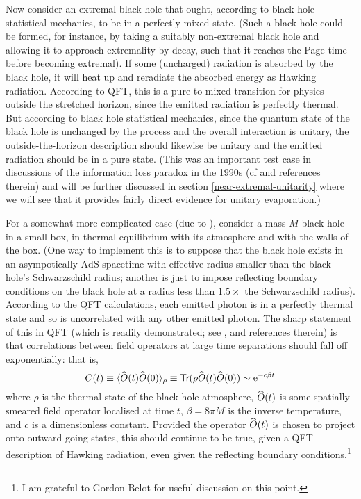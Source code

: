 \documentclass{article}
\newcommand{\AdS}{\mbox{AdS}}
\newcommand{\op}[1]{\ensuremath{\widehat{\textsf{\ensuremath{#1}}}}}
\newcommand{\tr}{\textsf{Tr}}
\newcommand{\be}{\begin{equation}}
\newcommand{\ee}{\end{equation}}
\newcommand{\e}[1]{\mathrm{e}^{#1}}
\begin{document}
Now consider an extremal black hole that ought, according to black hole statistical mechanics, to be in a perfectly mixed state. (Such a black hole could be formed, for instance, by taking a suitably non-extremal black hole and allowing it to approach extremality by decay, such that it reaches the Page time before becoming extremal).  If some (uncharged) radiation is absorbed by the black hole, it will heat up and reradiate the absorbed energy as Hawking radiation. According to QFT, this is a pure-to-mixed transition for physics outside the stretched horizon, since the emitted radiation is perfectly thermal. But according to black hole statistical mechanics, since the quantum state of the black hole is unchanged by the process and the overall interaction is unitary, the outside-the-horizon description should likewise be unitary and the emitted radiation should be in a pure state. (This was an important test case in discussions of the information loss paradox in the 1990s (cf  and references therein) and will be further discussed in section \ref{near-extremal-unitarity} where we will see that it provides fairly direct evidence for unitary evaporation.)

For a somewhat more complicated case (due to ), consider a mass-$M$ black hole in a small box, in thermal equilibrium with its atmosphere and with the walls of the box. (One way to implement this is to suppose that the black hole exists in an asympotically $\AdS$ spacetime with effective radius smaller than the black hole's Schwarzschild radius; another \cite{yorkcanonical} is just to impose reflecting boundary conditions on the black hole at a radius less than $1.5 \times$ the Schwarzschild radius). According to the QFT calculations, each emitted photon is in a perfectly thermal state and so is uncorrelated with any other emitted photon. The sharp statement of this in QFT (which is readily demonstrated; see ,  and references therein) is that correlations between field operators at large time separations should fall off exponentially: that is,
\be
C(t)\equiv \langle \op{O}(t)\op{O}(0)\rangle_\rho \equiv \tr (\rho \op{O}(t)\op{O}(0)) \sim \e{-c \beta t}
\ee
where $\rho$ is the thermal state of the black hole atmosphere, $\op{O}(t)$ is some spatially-smeared field operator localised at time $t$, $\beta=8\pi M$ is the inverse temperature, and $c$ is a dimensionless constant. Provided the operator $\op{O}(t)$ is chosen to project onto outward-going states, this should continue to be true, given a QFT description of Hawking radiation, even given the reflecting boundary conditions.\footnote{I am grateful to Gordon Belot for useful discussion on this point.}
\end{document}
